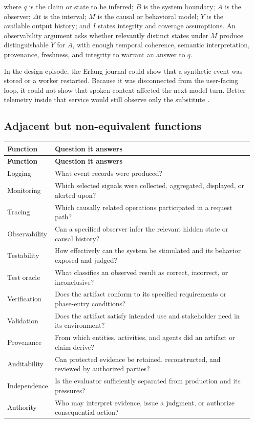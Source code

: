 \documentclass[10pt,a4paper]{article}
\begin{document}
where $q$ is the claim or state to be inferred; $B$ is the system boundary; $A$ is the observer; $\Delta t$ is the interval; $M$ is the causal or behavioral model; $Y$ is the available output history; and $I$ states integrity and coverage assumptions. An observability argument asks whether relevantly distinct states under $M$ produce distinguishable $Y$ for $A$, with enough temporal coherence, semantic interpretation, provenance, freshness, and integrity to warrant an answer to $q$.

In the design episode, the Erlang journal could show that a synthetic event was stored or a worker restarted. Because it was disconnected from the user-facing loop, it could not show that spoken context affected the next model turn. Better telemetry inside that service would still observe only the substitute \cite{daybreakblind,daybreakguided}.

\subsection{Adjacent but non-equivalent functions}

\begin{longtable}{>{\raggedright\arraybackslash}p{}>{\raggedright\arraybackslash}p{}}
\hline
\textbf{Function} & \textbf{Question it answers} \\
\hline
\endfirsthead
\hline
\textbf{Function} & \textbf{Question it answers} \\
\hline
\endhead
Logging & What event records were produced? \\
Monitoring & Which selected signals were collected, aggregated, displayed, or alerted upon? \\
Tracing & Which causally related operations participated in a request path? \\
Observability & Can a specified observer infer the relevant hidden state or causal history? \\
Testability & How effectively can the system be stimulated and its behavior exposed and judged? \\
Test oracle & What classifies an observed result as correct, incorrect, or inconclusive? \\
Verification & Does the artifact conform to its specified requirements or phase-entry conditions? \\
Validation & Does the artifact satisfy intended use and stakeholder need in its environment? \\
Provenance & From which entities, activities, and agents did an artifact or claim derive? \\
Auditability & Can protected evidence be retained, reconstructed, and reviewed by authorized parties? \\
Independence & Is the evaluator sufficiently separated from production and its pressures? \\
Authority & Who may interpret evidence, issue a judgment, or authorize consequential action? \\
\hline
\end{longtable}
\end{document}
